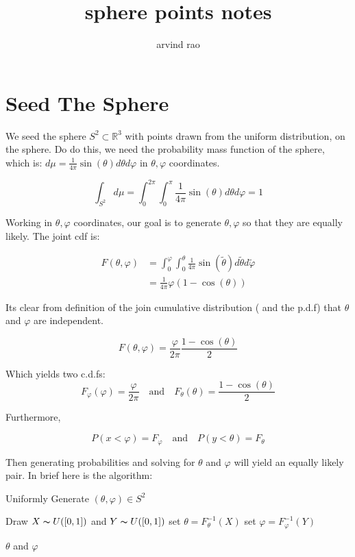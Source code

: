 \documentclass[10pt]{article}
\title{sphere points notes}
\date{}
\author{arvind rao}
\begin{document}
\maketitle

\section*{Seed The Sphere}
We seed the sphere $S^2 \subset \mathbb{R}^3$ with points drawn from the uniform distribution, on the sphere. Do do this, we need the probability mass function of the sphere, which is: $d \mu = \frac{1}{4 \pi}\sin(\theta) d \theta d\varphi$ in $\theta, \varphi$ coordinates.  

\[
 		\int_{S^2} d \mu = \int^{2\pi}_{0} \int^{\pi}_{0} \frac{1}{4\pi}\sin(\theta) d \theta d\varphi = 1
\]

Working in $\theta, \varphi$ coordinates, our goal is to generate $\theta, \varphi$ so that they are equally likely. The joint cdf is:

\begin{align*}
	F(\theta, \varphi)  & = \int^{\varphi}_{0} \int^{\theta}_{0} \frac{1}{4\pi}\sin(\tilde{\theta}) d \tilde{\theta} d\tilde{\varphi} \\
								 & = \frac{1}{4\pi} \varphi (1 - \cos(\theta))
\end{align*}

Its clear from definition of the join cumulative distribution ( and the p.d.f) that $\theta$ and $\varphi$ are independent.

\[
	F(\theta, \varphi) = \frac{\varphi}{2\pi} \frac{1 - \cos(\theta)}{2}
\]

Which yields two c.d.fs:
\[
	F_{\varphi}(\varphi) = \frac{\varphi}{2\pi} \quad \text{and} \quad F_{\theta}(\theta) = \frac{1 - \cos(\theta)}{2}
\]

Furthermore,

\[
			P( x < \varphi ) = F_{\varphi} \quad \text{and} \quad P( y < \theta ) = F_{\theta} 
\]

Then generating probabilities and solving for $\theta$ and $\varphi$ will yield an equally likely pair. In brief here is the algorithm:

\begin{algorithm}
\caption{Uniformly Generate $(\theta, \varphi) \in S^2$ }
\begin{algorithmic} 
\STATE Draw $X \thicksim U([0,1])$ and $Y \thicksim U([0,1])$
\STATE set $\theta = F_{\theta}^{-1}(X)$
\STATE set $\varphi = F_{\varphi}^{-1}(Y)$

\RETURN $\theta$ and $\varphi$        
\end{algorithmic}
\end{algorithm}
\end{document}
